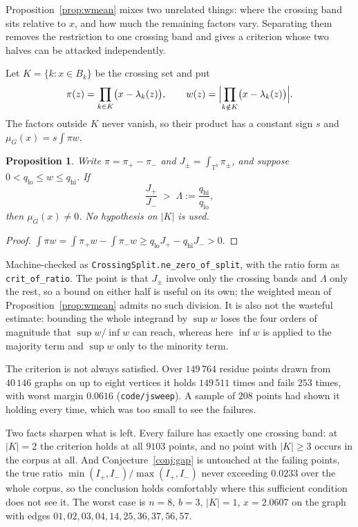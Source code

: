 \documentclass[11pt]{article}
\newtheorem{proposition}[theorem]{Proposition}
\theoremstyle{remark}
\begin{document}
Proposition~\ref{prop:wmean} mixes two unrelated things: where the crossing band sits
relative to $x$, and how much the remaining factors vary. Separating them removes the
restriction to one crossing band and gives a criterion whose two halves can be attacked
independently.

Let $K=\{k:x\in B_k\}$ be the crossing set and put
\[
   \pi(z)=\prod_{k\in K}\bigl(x-\lambda_k(z)\bigr),\qquad
   w(z)=\Bigl|\prod_{k\notin K}\bigl(x-\lambda_k(z)\bigr)\Bigr| .
\]
The factors outside $K$ never vanish, so their product has a constant sign $s$ and
$\mu_G(x)=s\int\pi w$.

\begin{proposition}\label{prop:split}
Write $\pi=\pi_+-\pi_-$ and $J_\pm=\int_{\mathbb T^b}\pi_\pm$, and suppose
$0<q_{\mathrm{lo}}\le w\le q_{\mathrm{hi}}$. If
\[
   \frac{J_+}{J_-}\;>\;\Lambda:=\frac{q_{\mathrm{hi}}}{q_{\mathrm{lo}}} ,
\]
then $\mu_G(x)\neq0$. No hypothesis on $|K|$ is used.
\end{proposition}

\begin{proof}
$\int\pi w=\int\pi_+w-\int\pi_-w\ge q_{\mathrm{lo}}J_+-q_{\mathrm{hi}}J_->0$.
\end{proof}

Machine-checked as \texttt{CrossingSplit.ne\_zero\_of\_split}, with the ratio form as
\texttt{crit\_of\_ratio}. The point is that $J_\pm$ involve only the crossing bands and
$\Lambda$ only the rest, so a bound on either half is useful on its own; the weighted mean of
Proposition~\ref{prop:wmean} admits no such division. It is also not the wasteful estimate:
bounding the whole integrand by $\sup w$ loses the four orders of magnitude that
$\sup w/\inf w$ can reach, whereas here $\inf w$ is applied to the majority term and $\sup w$
only to the minority term.

The criterion is not always satisfied. Over $149\,764$ residue points drawn from $40\,146$
graphs on up to eight vertices it holds $149\,511$ times and fails $253$ times, with worst
margin $0.0616$ (\texttt{code/jsweep}). A sample of $208$ points had shown it holding every
time, which was too small to see the failures.

Two facts sharpen what is left. Every failure has exactly one crossing band: at $|K|=2$ the
criterion holds at all $9103$ points, and no point with $|K|\ge3$ occurs in the corpus at all.
And Conjecture~\ref{conj:gap} is untouched at the failing points, the true ratio
$\min(I_+,I_-)/\max(I_+,I_-)$ never exceeding $0.0233$ over the whole corpus, so the
conclusion holds comfortably where this sufficient condition does not see it. The worst case
is $n=8$, $b=3$, $|K|=1$, $x=2.0607$ on the graph with edges
$01,02,03,04,14,25,36,37,56,57$.
\end{document}
